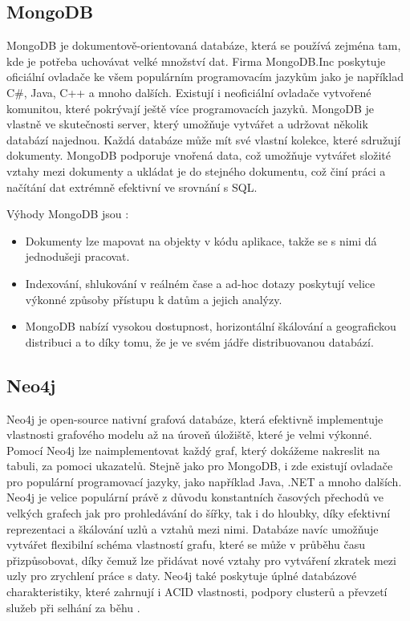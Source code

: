 \subsection{MongoDB}
MongoDB je dokumentově-orientovaná databáze, která se používá zejména tam, kde je potřeba uchovávat velké množství dat. Firma MongoDB.Inc poskytuje oficiální ovladače ke všem populárním programovacím jazykům jako je například C\#, Java, C++ a mnoho dalších. Existují i neoficiální ovladače vytvořené komunitou, které pokrývají ještě více programovacích jazyků.
\newline
\indent MongoDB je vlastně ve skutečnosti server, který umožňuje vytvářet a udržovat několik databází najednou. Každá databáze může mít své vlastní kolekce, které sdružují dokumenty.  MongoDB podporuje vnořená data, což umožňuje vytvářet složité vztahy mezi dokumenty a ukládat je do stejného dokumentu, což činí práci a načítání dat extrémně efektivní ve srovnání s SQL.\cite{mongo}
\newline

\noindent Výhody MongoDB jsou \cite{advantages_mongo}:
\begin{itemize}
\item Dokumenty lze mapovat na objekty v kódu aplikace, takže se s nimi dá jednodušeji pracovat.
\item Indexování, shlukování v reálném čase a ad-hoc dotazy poskytují velice výkonné způsoby přístupu k datům a jejich analýzy.
\item MongoDB nabízí vysokou dostupnost, horizontální škálování a geografickou distribuci a to díky tomu, že je ve svém jádře distribuovanou databází.
\end{itemize}

\subsection{Neo4j}
Neo4j je open-source nativní grafová databáze, která efektivně implementuje vlastnosti grafového modelu až na úroveň úložiště, které je velmi výkonné. Pomocí Neo4j lze naimplementovat každý graf, který dokážeme nakreslit na tabuli, za pomoci ukazatelů. Stejně jako pro MongoDB, i zde existují ovladače pro populární programovací jazyky, jako například Java, .NET a mnoho dalších.
\newline
\indent Neo4j je velice populární právě z důvodu konstantních časových přechodů ve velkých grafech jak pro prohledávání do šířky, tak i do hloubky, díky efektivní reprezentaci a škálování uzlů a vztahů mezi nimi. Databáze navíc umožňuje vytvářet flexibilní schéma vlastností grafu, které se může v průběhu času přizpůsobovat, díky čemuž lze přidávat nové vztahy pro vytváření zkratek mezi uzly pro zrychlení práce s daty. Neo4j také poskytuje úplné databázové charakteristiky, které zahrnují i \gls{ACID} vlastnosti, podpory clusterů a převzetí služeb při selhání za běhu \cite{neo4j}.


